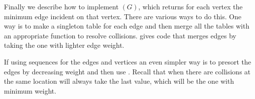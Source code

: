Finally we describe how to implement $(G)$, which
returns for each vertex the minimum edge incident on that vertex.
There are various ways to do this.  One way is to make a singleton
table for each edge and then merge all the tables with an appropriate
function to resolve collisions.   gives
code that merges edges by taking the one with lighter edge weight.

If using sequences for the edges and vertices an even simpler way is
to presort the edges by decreasing weight and then use .
Recall that when there are collisions at the same location
 will always take the last value, which will be the one
with minimum weight.

\begin{comment}
\section{Maximal Independent Set (MIS)}

In graph theory, an \emph{independent set} is a set of vertices from an
undirected graph that have no edges between them.  More formally, let a graph $G
= (V, E)$ be given. We say that a set $I \subseteq V$ is an independent set if
and only if $(I \times I) \cap E = \emptyset$.

For example, if vertices in a graph represent entities and edges represent
conflicts between them, an independent set is a group of non-conflicting
entities, which is a natural thing to want to know.  This turns out to be an
important substep in several parallel algorithms since it allows one to find
sets of things to do in parallel that don't conflict with each other.  For this
purpose, it is important to select a large independent set since it will allow
more things to run in parallel and presumably reduce the span of the algorithm.

Unfortunately, the problem of finding the overall largest independent
set---known as the Maximum Independent Set problem---is \textbf{NP}-hard. Its
close cousin Maximal Independent Set, however, admits efficient algorithms and
is a useful approximation to the harder problem.

More formally, the \emph{Maximal Independent Set} (MIS) problem is: given
an undirected graph $G = (V,E)$, find an independent set $I \subseteq V$
such that for all $v \in (V\setminus I)$, $I \cup \{v\}$ is not an
independent set. Such a set $I$ is maximal in the sense that we can't add
any other vertex and keep it independent, but it easily may not be a
maximum---i.e. largest---independent set in the graph.


\end{comment}
